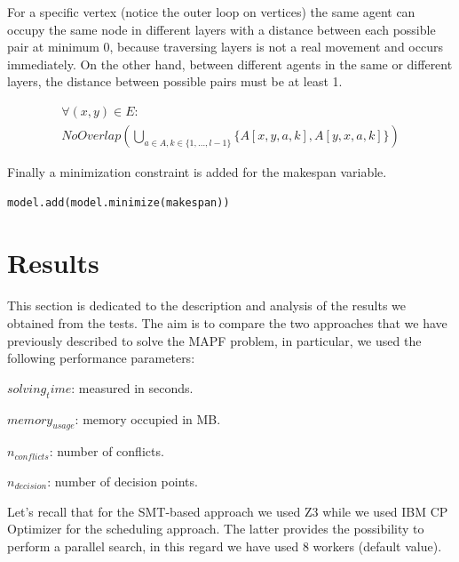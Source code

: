 \documentclass[12pt, a4paper, hidelinks]{article}
\numberwithin{equation}{section}
\begin{document}
For a specific vertex (notice the outer loop on vertices) the same agent can occupy the same node in different layers with a distance between each possible pair at minimum 0, because traversing layers is not a real movement and occurs immediately.
On the other hand, between different agents in the same or different layers, the distance between possible pairs must be at least 1.

\begin{description}\label{eq:equation_set_2.4}
\item \begin{equation}\begin{split} \forall (x, y) \in E: \\ NoOverlap(\bigcup_{a \in A, k \in \{1,\dots,l-1\}} \{A[x,y,a,k], A[y,x,a,k]\})\end{split}\label{eq:2.18}\end{equation}
\end{description}

Finally a minimization constraint is added for the makespan variable.
\begin{lstlisting}[label={lst:minimize2}]
model.add(model.minimize(makespan))
\end{lstlisting}

\section{Results}\label{sec:results}
This section is dedicated to the description and analysis of the results we obtained from the tests.
The aim is to compare the two approaches that we have previously described to solve the MAPF problem,
in particular, we used the following performance parameters:

\begin{description}
    \item $solving_time$: measured in seconds.
    \item $memory_{usage}$: memory occupied in MB.
    \item $n_{conflicts}$: number of conflicts.
    \item $n_{decision}$: number of decision points.
\end{description}

Let's recall that for the SMT-based approach we used Z3 while we used IBM CP Optimizer
for the scheduling approach. The latter provides the possibility to perform a parallel search,
in this regard we have used 8 workers (default value).
\end{document}
